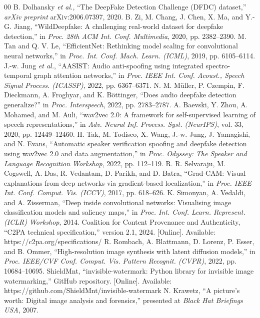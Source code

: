 \documentclass[conference]{IEEEtran}
\begin{document}
\begin{thebibliography}{00}
 B. Dolhansky \emph{et al.}, ``The DeepFake Detection Challenge (DFDC) dataset,'' \emph{arXiv preprint} arXiv:2006.07397, 2020.
 B. Zi, M. Chang, J. Chen, X. Ma, and Y.-G. Jiang, ``WildDeepfake: A challenging real-world dataset for deepfake detection,'' in \emph{Proc. 28th ACM Int. Conf. Multimedia}, 2020, pp. 2382--2390.
 M. Tan and Q. V. Le, ``EfficientNet: Rethinking model scaling for convolutional neural networks,'' in \emph{Proc. Int. Conf. Mach. Learn. (ICML)}, 2019, pp. 6105--6114.
 J.-w. Jung \emph{et al.}, ``AASIST: Audio anti-spoofing using integrated spectro-temporal graph attention networks,'' in \emph{Proc. IEEE Int. Conf. Acoust., Speech Signal Process. (ICASSP)}, 2022, pp. 6367--6371.
 N. M. M\"uller, P. Czempin, F. Dieckmann, A. Froghyar, and K. B\"ottinger, ``Does audio deepfake detection generalize?'' in \emph{Proc. Interspeech}, 2022, pp. 2783--2787.
 A. Baevski, Y. Zhou, A. Mohamed, and M. Auli, ``wav2vec 2.0: A framework for self-supervised learning of speech representations,'' in \emph{Adv. Neural Inf. Process. Syst. (NeurIPS)}, vol. 33, 2020, pp. 12449--12460.
 H. Tak, M. Todisco, X. Wang, J.-w. Jung, J. Yamagishi, and N. Evans, ``Automatic speaker verification spoofing and deepfake detection using wav2vec 2.0 and data augmentation,'' in \emph{Proc. Odyssey: The Speaker and Language Recognition Workshop}, 2022, pp. 112--119.
 R. R. Selvaraju, M. Cogswell, A. Das, R. Vedantam, D. Parikh, and D. Batra, ``Grad-CAM: Visual explanations from deep networks via gradient-based localization,'' in \emph{Proc. IEEE Int. Conf. Comput. Vis. (ICCV)}, 2017, pp. 618--626.
 K. Simonyan, A. Vedaldi, and A. Zisserman, ``Deep inside convolutional networks: Visualising image classification models and saliency maps,'' in \emph{Proc. Int. Conf. Learn. Represent. (ICLR) Workshop}, 2014.
 Coalition for Content Provenance and Authenticity, ``C2PA technical specification,'' version 2.1, 2024. [Online]. Available: https://c2pa.org/specifications/
 R. Rombach, A. Blattmann, D. Lorenz, P. Esser, and B. Ommer, ``High-resolution image synthesis with latent diffusion models,'' in \emph{Proc. IEEE/CVF Conf. Comput. Vis. Pattern Recognit. (CVPR)}, 2022, pp. 10684--10695.
 ShieldMnt, ``invisible-watermark: Python library for invisible image watermarking,'' GitHub repository. [Online]. Available: https://github.com/ShieldMnt/invisible-watermark
 N. Krawetz, ``A picture's worth: Digital image analysis and forensics,'' presented at \emph{Black Hat Briefings USA}, 2007.

\end{thebibliography}
\end{document}
